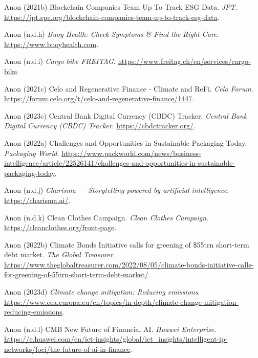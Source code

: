 \documentclass[
  letterpaper,
  DIV=11,
  numbers=noendperiod]{scrartcl}
\newlength{\cslhangindent}
\newenvironment{CSLReferences}[2] %
 {\begin{list}{}{%
  \setlength{\itemindent}{0pt}
  \setlength{\leftmargin}{0pt}
  \setlength{\parsep}{0pt}
  \ifodd #1
   \setlength{\leftmargin}{\cslhangindent}
   \setlength{\itemindent}{-1\cslhangindent}
  \fi
  \setlength{\itemsep}{#2\baselineskip}}}
 {\end{list}}
\begin{document}
\begin{CSLReferences}{0}{1}
Anon (2021b) Blockchain {Companies Team Up To Track ESG Data}.
\emph{JPT}.
\url{https://jpt.spe.org/blockchain-companies-team-up-to-track-esg-data}.

Anon (n.d.h) \emph{Buoy {Health}: {Check Symptoms} \& {Find} the {Right
Care}}. \url{https://www.buoyhealth.com}.

Anon (n.d.i) \emph{Cargo bike {\textbar} {FREITAG}}.
\url{https://www.freitag.ch/en/services/cargo-bike}.

Anon (2021c) Celo and {Regenerative Finance} - {Climate} and {ReFi}.
\emph{Celo Forum}.
\url{https://forum.celo.org/t/celo-and-regenerative-finance/1447}.

Anon (2023c) Central {Bank Digital Currency} ({CBDC}) {Tracker}.
\emph{Central Bank Digital Currency (CBDC) Tracker}.
\url{https://cbdctracker.org/}.

Anon (2022a) Challenges and {Opportunities} in {Sustainable Packaging
Today}. \emph{Packaging World}.
\url{https://www.packworld.com/news/business-intelligence/article/22526141/challenges-and-opportunities-in-sustainable-packaging-today}.

Anon (n.d.j) \emph{Charisma --- {Storytelling} powered by artificial
intelligence}. \url{https://charisma.ai/}.

Anon (n.d.k) Clean {Clothes Campaign}. \emph{Clean Clothes Campaign}.
\url{https://cleanclothes.org/front-page}.

Anon (2022b) Climate {Bonds Initiative} calls for greening of \$55trn
short-term debt market. \emph{The Global Treasurer}.
\url{https://www.theglobaltreasurer.com/2022/08/05/climate-bonds-initiative-calls-for-greening-of-55trn-short-term-debt-market/}.

Anon (2023d) \emph{Climate change mitigation: Reducing emissions}.
\url{https://www.eea.europa.eu/en/topics/in-depth/climate-change-mitigation-reducing-emissions}.

Anon (n.d.l) {CMB} {\textbar} {New Future} of {Financial AI}.
\emph{Huawei Enterprise}.
\url{https://e.huawei.com/en/ict-insights/global/ict_insights/intelligent-ip-networks/foci/the-future-of-ai-in-finance}.


\end{CSLReferences}
\end{document}
